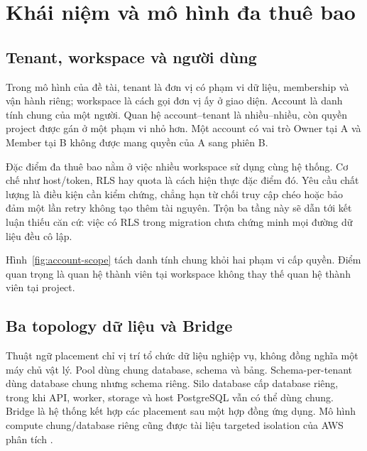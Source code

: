 \section{Khái niệm và mô hình đa thuê bao}\label{sec:concepts}
\subsection{Tenant, workspace và người dùng}
Trong mô hình của đề tài, tenant là đơn vị có phạm vi dữ liệu, membership và vận hành riêng; workspace là cách gọi đơn vị ấy ở giao diện. Account là danh tính chung của một người. Quan hệ account--tenant là nhiều--nhiều, còn quyền project được gán ở một phạm vi nhỏ hơn. Một account có vai trò Owner tại A và Member tại B không được mang quyền của A sang phiên B.

Đặc điểm đa thuê bao nằm ở việc nhiều workspace sử dụng cùng hệ thống. Cơ chế như host\slash token, RLS hay quota là cách hiện thực đặc điểm đó. Yêu cầu chất lượng là điều kiện cần kiểm chứng, chẳng hạn từ chối truy cập chéo hoặc bảo đảm một lần retry không tạo thêm tài nguyên. Trộn ba tầng này sẽ dẫn tới kết luận thiếu căn cứ: việc có RLS trong migration chưa chứng minh mọi đường dữ liệu đều cô lập.

Hình~\ref{fig:account-scope} tách danh tính chung khỏi hai phạm vi cấp quyền. Điểm quan trọng là quan hệ thành viên tại workspace không thay thế quan hệ thành viên tại project.


\subsection{Ba topology dữ liệu và Bridge}
Thuật ngữ placement chỉ vị trí tổ chức dữ liệu nghiệp vụ, không đồng nghĩa một máy chủ vật lý. Pool dùng chung database, schema và bảng. Schema-per-tenant dùng database chung nhưng schema riêng. Silo database cấp database riêng, trong khi API, worker, storage và host PostgreSQL vẫn có thể dùng chung. Bridge là hệ thống kết hợp các placement sau một hợp đồng ứng dụng. Mô hình compute chung\slash database riêng cũng được tài liệu targeted isolation của AWS phân tích \citep{awsTargetedIsolation}.

